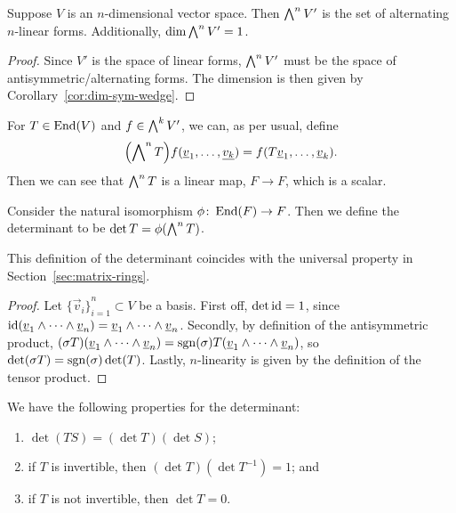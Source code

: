 \begin{theorem}
    Suppose \(V\) is an \(n\)-dimensional vector space.
    Then \(\operatorname{{\bigwedge}}^n V'\) is the set of alternating \(n\)-linear forms.
    Additionally, \(\dim \operatorname{{\bigwedge}}^n V' = 1\).
\end{theorem}
\begin{proof}
    Since \(V'\) is the space of linear forms,
    \(\operatorname{{\bigwedge}}^n V'\) must be the space of antisymmetric/alternating forms.
    The dimension is then given by Corollary~\ref{cor:dim-sym-wedge}.
\end{proof}
\begin{definition}
    For \(T \in \operatorname{End}(V)\) and \(f \in \operatorname{{\bigwedge}}^k V'\),
    we can, as per usual, define
    \begin{equation*}
        \pqty{\Asym^n T}f(\vec{v}_1,\hdots,\vec{v_k})
        = f(T\vec{v}_1,\hdots,\vec{v}_k).
    \end{equation*}
    Then we can see that \(\operatorname{{\bigwedge}}^n T\) is a linear map, \(F \to F\),
    which is a scalar.
\end{definition}
\begin{definition}
    Consider the natural isomorphism \(\phi\colon\operatorname{End}(F)\to F\).
    Then we define the determinant to be \(\det T = \phi(\operatorname{{\bigwedge}}^n T)\).
\end{definition}
\begin{proposition}
    This definition of the determinant coincides
    with the universal property in Section~\ref{sec:matrix-rings}.
\end{proposition}
\begin{proof}
    Let \({\{\vec{v}_i\}}_{i=1}^n \subset V\) be a basis.
    First off, \(\det \operatorname{id} = 1\),
    since \(\operatorname{id}(\underline{v}_1 \wedge \cdots \wedge \underline{v}_n) = \underline{v}_1 \wedge \cdots \wedge \underline{v}_n\).
    Secondly, by definition of the antisymmetric product,
    \((\sigma T)(\underline{v}_1 \wedge \cdots \wedge \underline{v}_n) = \operatorname{sgn}(\sigma) T(\underline{v}_1 \wedge \cdots \wedge \underline{v}_n)\),
    so \(\det(\sigma T) = \operatorname{sgn}(\sigma)\det(T)\).
    Lastly, \(n\)-linearity is given by the definition of the tensor product.
\end{proof}
\begin{proposition}\label{prop:det-properties}
    We have the following properties for the determinant:
    \begin{enumerate}[label={(\alph*)}, itemsep=0mm]
        \item \(\det(TS) = (\det T)(\det S)\);
        \item if \(T\) is invertible, then \((\det T)(\det T^{-1}) = 1\); and
        \item if \(T\) is not invertible, then \(\det T = 0\).
    \end{enumerate}
\end{proposition}
